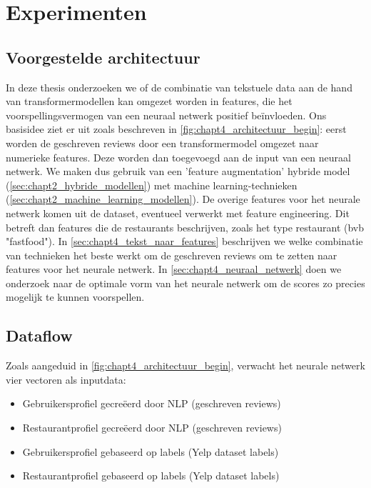 \chapter{Experimenten}

\section{Voorgestelde architectuur}
In deze thesis onderzoeken we of de combinatie van tekstuele data aan de hand van transformermodellen kan omgezet worden in features, die het voorspellingsvermogen van een neuraal netwerk positief beïnvloeden. Ons basisidee ziet er uit zoals beschreven in \autoref{fig:chapt4_architectuur_begin}: eerst worden de geschreven reviews door een transformermodel omgezet naar numerieke features. Deze worden dan toegevoegd aan de input van een neuraal netwerk. We maken dus gebruik van een 'feature augmentation'  hybride model (\ref{sec:chapt2_hybride_modellen}) met machine learning-technieken (\ref{sec:chapt2_machine_learning_modellen}). De overige features voor het neurale netwerk komen uit de dataset, eventueel verwerkt met feature engineering. Dit betreft dan features die de restaurants beschrijven, zoals het type restaurant (bvb "fastfood"). In \autoref{sec:chapt4_tekst_naar_features} beschrijven we welke combinatie van technieken het beste werkt om de geschreven reviews om te zetten naar features voor het neurale netwerk. In \autoref{sec:chapt4_neuraal_netwerk} doen we onderzoek naar de optimale vorm van het neurale netwerk om de scores zo precies mogelijk te kunnen voorspellen.


\section{Dataflow}
\label{sec:chapt4_data_flow}
Zoals aangeduid in \autoref{fig:chapt4_architectuur_begin}, verwacht het neurale netwerk vier vectoren als inputdata:
\begin{itemize}
    \item Gebruikersprofiel gecreëerd door NLP (geschreven reviews)
    \item Restaurantprofiel gecreëerd door NLP (geschreven reviews)
    \item Gebruikersprofiel gebaseerd op labels (Yelp dataset labels)
    \item Restaurantprofiel gebaseerd op labels (Yelp dataset labels)
\end{itemize}

